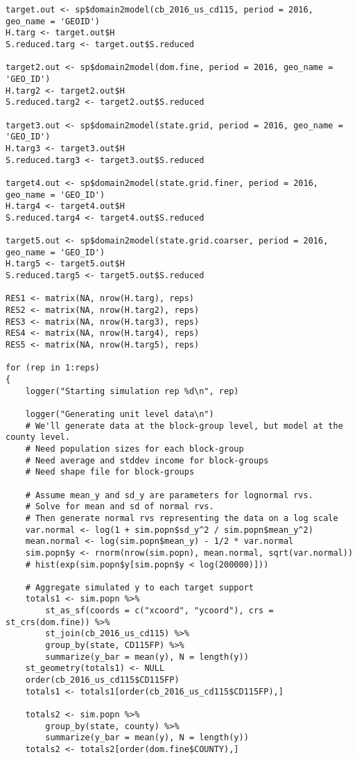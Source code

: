 \documentclass[12pt]{article}
\begin{document}
\begin{scriptsize}
\begin{verbatim}
target.out <- sp$domain2model(cb_2016_us_cd115, period = 2016, geo_name = 'GEOID')
H.targ <- target.out$H
S.reduced.targ <- target.out$S.reduced

target2.out <- sp$domain2model(dom.fine, period = 2016, geo_name = 'GEO_ID')
H.targ2 <- target2.out$H
S.reduced.targ2 <- target2.out$S.reduced

target3.out <- sp$domain2model(state.grid, period = 2016, geo_name = 'GEO_ID')
H.targ3 <- target3.out$H
S.reduced.targ3 <- target3.out$S.reduced

target4.out <- sp$domain2model(state.grid.finer, period = 2016, geo_name = 'GEO_ID')
H.targ4 <- target4.out$H
S.reduced.targ4 <- target4.out$S.reduced

target5.out <- sp$domain2model(state.grid.coarser, period = 2016, geo_name = 'GEO_ID')
H.targ5 <- target5.out$H
S.reduced.targ5 <- target5.out$S.reduced

RES1 <- matrix(NA, nrow(H.targ), reps)
RES2 <- matrix(NA, nrow(H.targ2), reps)
RES3 <- matrix(NA, nrow(H.targ3), reps)
RES4 <- matrix(NA, nrow(H.targ4), reps)
RES5 <- matrix(NA, nrow(H.targ5), reps)

for (rep in 1:reps)
{
	logger("Starting simulation rep %d\n", rep)

	logger("Generating unit level data\n")
	# We'll generate data at the block-group level, but model at the county level.
	# Need population sizes for each block-group
	# Need average and stddev income for block-groups
	# Need shape file for block-groups

	# Assume mean_y and sd_y are parameters for lognormal rvs.
	# Solve for mean and sd of normal rvs.
	# Then generate normal rvs representing the data on a log scale
	var.normal <- log(1 + sim.popn$sd_y^2 / sim.popn$mean_y^2)
	mean.normal <- log(sim.popn$mean_y) - 1/2 * var.normal
	sim.popn$y <- rnorm(nrow(sim.popn), mean.normal, sqrt(var.normal))
	# hist(exp(sim.popn$y[sim.popn$y < log(200000)]))

	# Aggregate simulated y to each target support
	totals1 <- sim.popn %>%
		st_as_sf(coords = c("xcoord", "ycoord"), crs = st_crs(dom.fine)) %>%
		st_join(cb_2016_us_cd115) %>%
		group_by(state, CD115FP) %>%
		summarize(y_bar = mean(y), N = length(y))
	st_geometry(totals1) <- NULL
	order(cb_2016_us_cd115$CD115FP)
	totals1 <- totals1[order(cb_2016_us_cd115$CD115FP),]

	totals2 <- sim.popn %>%
		group_by(state, county) %>%
		summarize(y_bar = mean(y), N = length(y))
	totals2 <- totals2[order(dom.fine$COUNTY),]


\end{verbatim}
\end{scriptsize}
\end{document}
